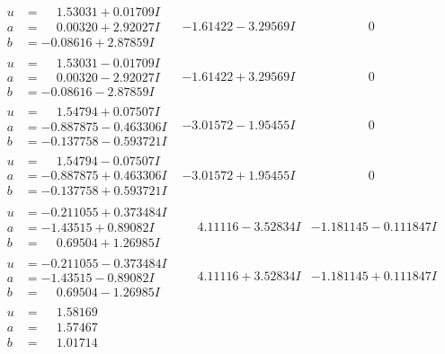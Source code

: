 \documentclass[1p]{elsarticle_modified}
\theoremstyle{definition}
\begin{document}
$$\begin{array}{c|c|c}
\begin{aligned}
u &= \phantom{-}1.53031 + 0.01709 I \\
a &= \phantom{-}0.00320 + 2.92027 I \\
b &= -0.08616 + 2.87859 I\end{aligned}
 & -1.61422 - 3.29569 I & \phantom{-0.000000 } 0 \\ \hline\begin{aligned}
u &= \phantom{-}1.53031 - 0.01709 I \\
a &= \phantom{-}0.00320 - 2.92027 I \\
b &= -0.08616 - 2.87859 I\end{aligned}
 & -1.61422 + 3.29569 I & \phantom{-0.000000 } 0 \\ \hline\begin{aligned}
u &= \phantom{-}1.54794 + 0.07507 I \\
a &= -0.887875 - 0.463306 I \\
b &= -0.137758 - 0.593721 I\end{aligned}
 & -3.01572 - 1.95455 I & \phantom{-0.000000 } 0 \\ \hline\begin{aligned}
u &= \phantom{-}1.54794 - 0.07507 I \\
a &= -0.887875 + 0.463306 I \\
b &= -0.137758 + 0.593721 I\end{aligned}
 & -3.01572 + 1.95455 I & \phantom{-0.000000 } 0 \\ \hline\begin{aligned}
u &= -0.211055 + 0.373484 I \\
a &= -1.43515 + 0.89082 I \\
b &= \phantom{-}0.69504 + 1.26985 I\end{aligned}
 & \phantom{-}4.11116 - 3.52834 I & -1.181145 - 0.111847 I \\ \hline\begin{aligned}
u &= -0.211055 - 0.373484 I \\
a &= -1.43515 - 0.89082 I \\
b &= \phantom{-}0.69504 - 1.26985 I\end{aligned}
 & \phantom{-}4.11116 + 3.52834 I & -1.181145 + 0.111847 I \\ \hline\begin{aligned}
u &= \phantom{-}1.58169\phantom{ +0.000000I} \\
a &= \phantom{-}1.57467\phantom{ +0.000000I} \\
b &= \phantom{-}1.01714\phantom{ +0.000000I}\end{aligned}

\end{array}$$
\end{document}
